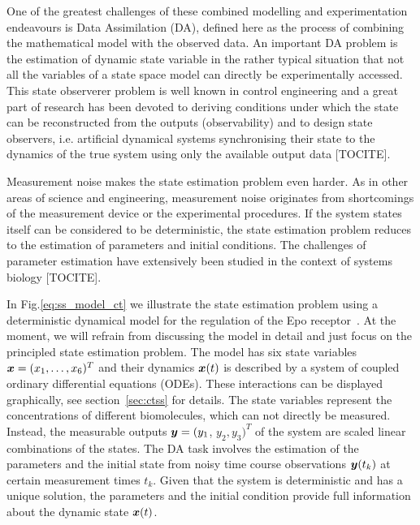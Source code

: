 \documentclass[10pt,a4paper, twocolumn]{article}
\renewcommand{\vec}[1]{{\mbox{\mathversion{bold}\ensuremath{#1}}}}
\begin{document}
One of the greatest challenges of these combined modelling and experimentation endeavours is Data Assimilation (DA), defined here as the process of combining the mathematical model with the observed data. An important DA problem is the estimation of dynamic state variable in the rather typical situation that not all the variables of a state space model can directly be experimentally accessed. This state observerer problem is well known in control engineering and a great part of research has been devoted to deriving conditions under which the state can be reconstructed from the outputs (observability) and to design state observers, i.e. artificial dynamical systems synchronising their state to the dynamics of the true system using only the available 
output  data [TOCITE]. 
 
Measurement noise  makes the state estimation problem even harder. As in other areas of science and engineering,  measurement noise originates from 
shortcomings of the measurement device or the experimental procedures.  If the system states itself can be considered to be deterministic, the state estimation problem reduces to the estimation of parameters and initial conditions. The challenges of parameter estimation have extensively been studied in the context of systems biology [TOCITE]. 

In Fig.\ref{eq:ss_model_ct} we illustrate the state estimation problem using a deterministic dynamical model for the regulation of the Epo receptor~\cite{becker_covering_2010}. At the moment, we will refrain from discussing the model in detail and just focus on the principled state estimation problem. The model has six state variables $\vec{x}=(x_1,\ldots, x_6)^T$ and their dynamics $\vec{x}(t)$ is described by a system of coupled ordinary differential equations (ODEs). These interactions can be displayed graphically, see section~\ref{sec:ctss} for details. The state variables represent the concentrations of different biomolecules, which can not directly be measured. Instead, the measurable outputs $\vec{y}=(y_1$, $y_2, y_3)^T$ of the system are scaled linear combinations of the states. The DA task involves the estimation of the parameters and the initial state from noisy time course observations $\vec{y}(t_k)$ at certain measurement times $t_k$. Given that the system is deterministic and has a unique solution, the parameters and the initial condition  provide full information about the dynamic state $\vec{x}(t)$. 
\end{document}
